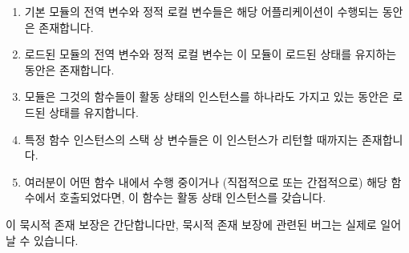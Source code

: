 \begin{enumerate}
\item	기본 모듈의 전역 변수와 정적 로컬 변수들은 해당 어플리케이션이 수행되는
	동안은 존재합니다.
\item	로드된 모듈의 전역 변수와 정적 로컬 변수는 이 모듈이 로드된 상태를
	유지하는 동안은 존재합니다.
\item	모듈은 그것의 함수들이 활동 상태의 인스턴스를 하나라도 가지고 있는
	동안은 로드된 상태를 유지합니다.
\item	특정 함수 인스턴스의 스택 상 변수들은 이 인스턴스가 리턴할 때까지는
	존재합니다.
\item	여러분이 어떤 함수 내에서 수행 중이거나 (직접적으로 또는 간접적으로)
	해당 함수에서 호출되었다면, 이 함수는 활동 상태 인스턴스를 갖습니다.

\iffalse

\item	Global variables and static local variables in the base module
	will exist as long as the application is running.
\item	Global variables and static local variables in a loaded module
	will exist as long as that module remains loaded.
\item	A module will remain loaded as long as at least one of its functions
	has an active instance.
\item	A given function instance's on-stack variables will exist until
	that instance returns.
\item	If you are executing within a given function or have been
	called (directly or indirectly) from that function,
	then the given function has an active instance.

\fi

\end{enumerate}

이 묵시적 존재 보장은 간단합니다만, 묵시적 존재 보장에 관련된 버그는 실제로
일어날 수 있습니다.

\iffalse

These implicit existence guarantees are straightforward, though
bugs involving implicit existence guarantees really can happen.

\fi

